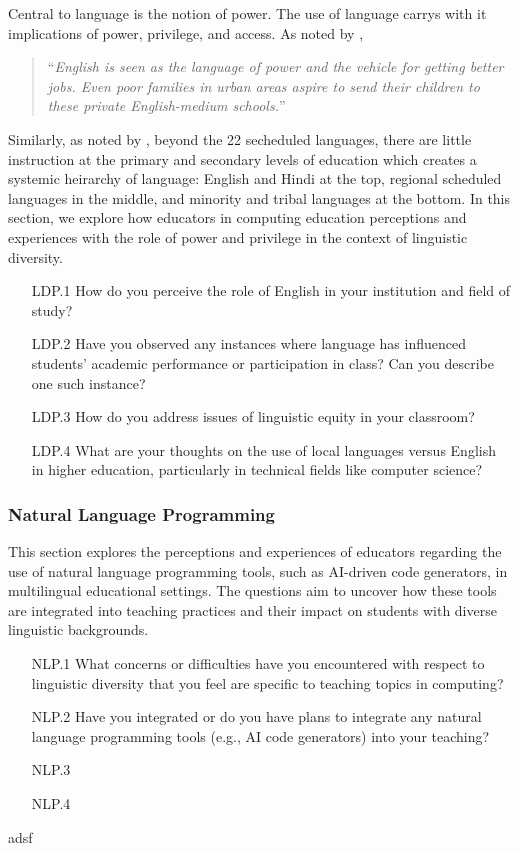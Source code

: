 Central to language is the notion of power. The use of language carrys with it
implications of power, privilege, and access. As noted by \citet{jhingran2009hundreds},
\begin{quote}
  ``\textit{English is seen as the language of power and the vehicle for getting better jobs. Even poor families in urban areas aspire to send their children to these private English-medium schools.}''
\end{quote}
Similarly, as noted by , beyond the 22 secheduled
languages, there are little instruction at the primary and secondary levels of
education which creates a systemic heirarchy of language: English and Hindi at
the top, regional scheduled languages in the middle, and minority and tribal
languages at the bottom. In this section, we explore how educators in computing
education perceptions and experiences with the role of power and privilege in
the context of linguistic diversity. 
\begin{enumerate}
  \item[LDP.1] How do you perceive the role of English in your institution and
    field of study?
  \item[LDP.2] Have you observed any instances where language has influenced
    students' academic performance or participation in class? Can you describe
    one such instance?
  \item[LDP.3] How do you address issues of linguistic equity in your classroom?
  \item[LDP.4] What are your thoughts on the use of local languages versus
    English in higher education, particularly in technical fields like computer
    science?
\end{enumerate}

\subsubsection{Natural Language Programming}\label{subsubsec:natural-language-programming}

This section explores the perceptions and experiences of educators regarding
the use of natural language programming tools, such as AI-driven code
generators, in multilingual educational settings. The questions aim to uncover
how these tools are integrated into teaching practices and their impact on
students with diverse linguistic backgrounds.
\begin{enumerate}
  \item[NLP.1] What concerns or difficulties have you encountered with respect
    to linguistic diversity that you feel are specific to teaching topics in computing?
  \item[NLP.2] Have you integrated or do you have plans to integrate any
    natural language programming tools (e.g., AI code generators) into your
    teaching? 
  \item[NLP.3] 
  \item[NLP.4]
\end{enumerate}
adsf


